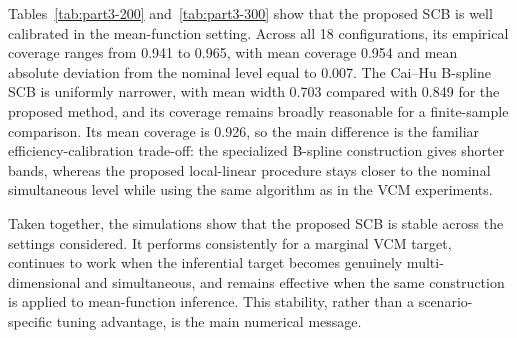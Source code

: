 \documentclass[12pt]{article} %
\theoremstyle{definition}
\begin{document}
\begin{table}[t!]
\caption{Part 3: mean function SCB, comparing the proposed band with the
Cai--Hu (2025) B-spline band for \(n=300\).}
\label{tab:part3-300}\par
{}
\end{table}

Tables~\ref{tab:part3-200} and~\ref{tab:part3-300} show that the proposed
SCB is well calibrated in the mean-function setting. Across all 18
configurations, its empirical coverage ranges from 0.941 to 0.965, with mean
coverage 0.954 and mean absolute deviation from the nominal level equal to
0.007. The Cai--Hu B-spline SCB is uniformly narrower, with mean width 0.703
compared with 0.849 for the proposed method, and its coverage remains broadly
reasonable for a finite-sample comparison. Its mean coverage is 0.926, so the
main difference is the familiar efficiency-calibration trade-off: the
specialized B-spline construction gives shorter bands, whereas the proposed
local-linear procedure stays closer to the nominal simultaneous level while
using the same algorithm as in the VCM experiments.

Taken together, the simulations show that the proposed SCB is stable across
the settings considered. It performs consistently for a marginal VCM target,
continues to work when the inferential target becomes genuinely
multi-dimensional and simultaneous, and remains effective when the same
construction is applied to mean-function inference. This stability, rather
than a scenario-specific tuning advantage, is the main numerical message.
\end{document}
